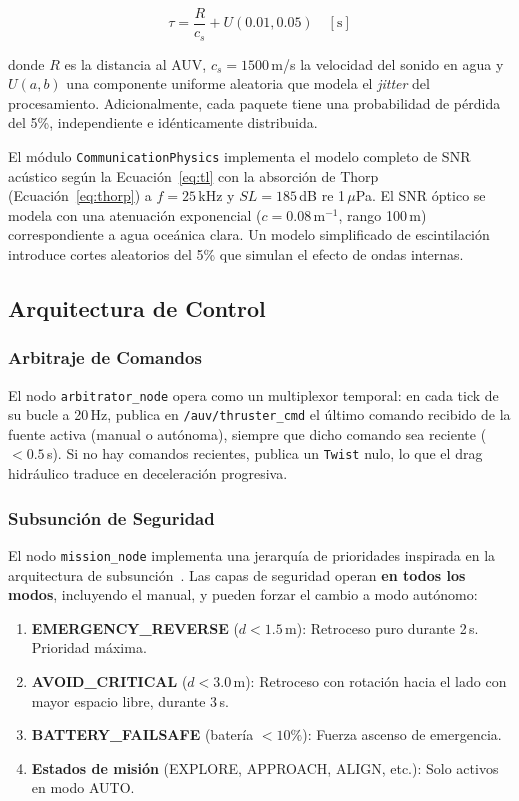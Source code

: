 \documentclass[10pt,twocolumn,letterpaper]{article}
\begin{document}
\begin{equation}
\tau = \frac{R}{c_s} + U(0.01, 0.05) \quad [\text{s}]
\label{eq:delay}
\end{equation}

donde $R$ es la distancia al AUV, $c_s = 1500$\,m/s la velocidad del sonido en agua y $U(a,b)$ una componente uniforme aleatoria que modela el \textit{jitter} del procesamiento. Adicionalmente, cada paquete tiene una probabilidad de pérdida del 5\%, independiente e idénticamente distribuida.

El módulo \texttt{CommunicationPhysics} implementa el modelo completo de SNR acústico según la Ecuación~\ref{eq:tl} con la absorción de Thorp (Ecuación~\ref{eq:thorp}) a $f = 25$\,kHz y $SL = 185$\,dB re 1\,$\mu$Pa. El SNR óptico se modela con una atenuación exponencial ($c = 0.08$\,m$^{-1}$, rango 100\,m) correspondiente a agua oceánica clara. Un modelo simplificado de escintilación introduce cortes aleatorios del 5\% que simulan el efecto de ondas internas.

\subsection{Arquitectura de Control}

\subsubsection{Arbitraje de Comandos}

El nodo \texttt{arbitrator\_node} opera como un multiplexor temporal: en cada tick de su bucle a 20\,Hz, publica en \texttt{/auv/thruster\_cmd} el último comando recibido de la fuente activa (manual o autónoma), siempre que dicho comando sea reciente ($< 0.5$\,s). Si no hay comandos recientes, publica un \texttt{Twist} nulo, lo que el drag hidráulico traduce en deceleración progresiva.

\subsubsection{Subsunción de Seguridad}

El nodo \texttt{mission\_node} implementa una jerarquía de prioridades inspirada en la arquitectura de subsunción~\cite{brooks1986}. Las capas de seguridad operan \textbf{en todos los modos}, incluyendo el manual, y pueden forzar el cambio a modo autónomo:

\begin{enumerate}[leftmargin=*,itemsep=2pt]
    \item \textbf{EMERGENCY\_REVERSE} ($d < 1.5$\,m): Retroceso puro durante 2\,s. Prioridad máxima.
    \item \textbf{AVOID\_CRITICAL} ($d < 3.0$\,m): Retroceso con rotación hacia el lado con mayor espacio libre, durante 3\,s.
    \item \textbf{BATTERY\_FAILSAFE} (batería $< 10\%$): Fuerza ascenso de emergencia.
    \item \textbf{Estados de misión} (EXPLORE, APPROACH, ALIGN, etc.): Solo activos en modo AUTO.
\end{enumerate}
\end{document}
